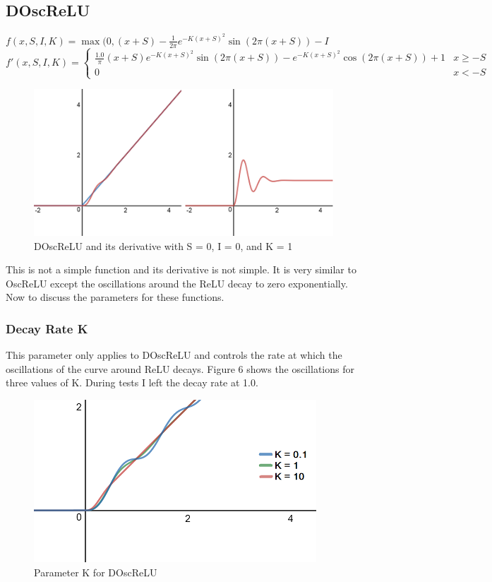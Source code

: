 \documentclass{amsart}
\theoremstyle{definition}
\theoremstyle{remark}
\numberwithin{equation}{section}
\newcommand{\blankbox}[2]{%
  \parbox{\columnwidth}{\centering
    \setlength{\fboxsep}{0pt}%
    \fbox{\raisebox{0pt}[#2]{\hspace{#1}}}%
  }%
}
\begin{document}
\subsection{DOscReLU}  \hfill \break 
\hfill\break
$f(x,S,I,K) = \max(0, (x + S) - \frac{1}{2\pi}e^{-K(x+S)^2}\sin(2\pi (x+S)) - I$ \hfill \break 
\hfill\break
$f'(x,S,I,K) = \begin{cases}\frac{1.0}{\pi}(x+S)e^{-K(x+S)^2}\sin(2\pi(x+S))-e^{-K(x+S)^2}\cos(2\pi(x+S)) + 1 & x \geq -S \\ 0 & x < -S \end{cases}$ \hfill \break 

\begin{figure}[!h]
\includegraphics[1]{DOscReLU_with_ReLU_Deriv.png}
\caption{DOscReLU and its derivative with S = 0, I = 0, and K = 1}
\label{Figure 5}
\end{figure}  

This is not a simple function and its derivative is not simple.  It is very similar to OscReLU except the oscillations around the ReLU decay to zero exponentially.   
Now to discuss the parameters for these functions.  

\newpage
\subsubsection{Decay Rate K} \hfill\break  

This parameter only applies to DOscReLU and controls the rate at which the oscillations of the curve around ReLU decays.  Figure 6 shows the oscillations for three values of K.  During tests I left the decay rate at 1.0.

\begin{figure}[!h]
\includegraphics[1]{DecayRate.png}
\caption{Parameter K for DOscReLU}
\label{Figure 6}
\end{figure} 
\end{document}
